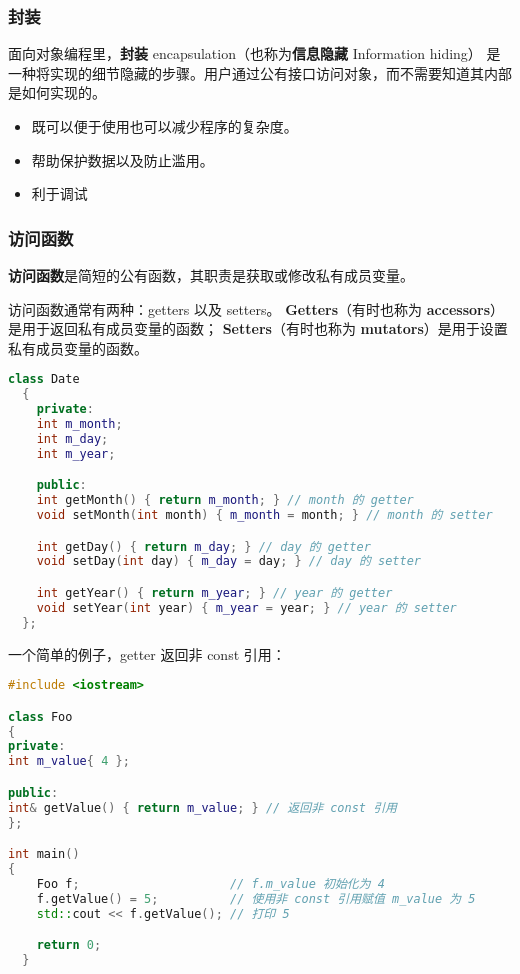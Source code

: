 \documentclass[../../LearnCpp.tex]{subfiles}
\begin{document}

\subsubsection*{封装}

面向对象编程里，\textbf{封装} encapsulation（也称为\textbf{信息隐藏} Information hiding）
是一种将实现的细节隐藏的步骤。用户通过公有接口访问对象，而不需要知道其内部是如何实现的。

\begin{itemize}
    \item 既可以便于使用也可以减少程序的复杂度。
    \item 帮助保护数据以及防止滥用。
    \item 利于调试
\end{itemize}

\subsubsection*{访问函数}

\textbf{访问函数}是简短的公有函数，其职责是获取或修改私有成员变量。

访问函数通常有两种：getters 以及 setters。
\textbf{Getters}（有时也称为 \textbf{accessors}）是用于返回私有成员变量的函数；
\textbf{Setters}（有时也称为 \textbf{mutators}）是用于设置私有成员变量的函数。

\begin{lstlisting}[language=C++]
class Date
  {
    private:
    int m_month;
    int m_day;
    int m_year;

    public:
    int getMonth() { return m_month; } // month 的 getter
    void setMonth(int month) { m_month = month; } // month 的 setter

    int getDay() { return m_day; } // day 的 getter
    void setDay(int day) { m_day = day; } // day 的 setter

    int getYear() { return m_year; } // year 的 getter
    void setYear(int year) { m_year = year; } // year 的 setter
  };
\end{lstlisting}

一个简单的例子，getter 返回非 const 引用：

\begin{lstlisting}[language=C++]
#include <iostream>

class Foo
{
private:
int m_value{ 4 };

public:
int& getValue() { return m_value; } // 返回非 const 引用
};

int main()
{
    Foo f;                     // f.m_value 初始化为 4
    f.getValue() = 5;          // 使用非 const 引用赋值 m_value 为 5
    std::cout << f.getValue(); // 打印 5

    return 0;
  }
\end{lstlisting}
\end{document}

